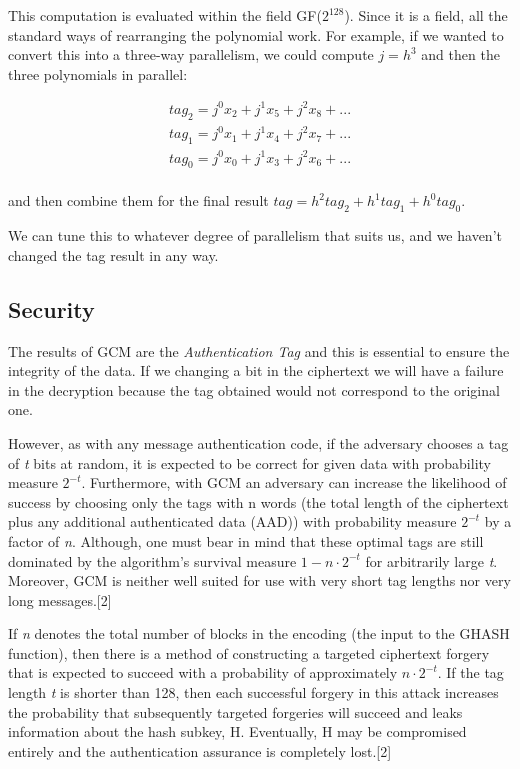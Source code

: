 \documentclass[11pt]{article}
\begin{document}
This computation is evaluated within the field GF($2^{128}$). Since it is a field, all the standard ways of rearranging the polynomial work.
For example, if we wanted to convert this into a three-way parallelism, we could compute $j=h^3$ and then the three polynomials in parallel:

$$
\begin{array}{l}
tag_2 = j^0 x_2 + j^1 x_5 + j^2 x_8 + ... \\
tag_1 = j^0 x_1 + j^1 x_4 + j^2 x_7 + ... \\
tag_0 = j^0 x_0 + j^1 x_3 + j^2 x_6 + ... \\
\end{array}
$$

and then combine them for the final result $ tag = h^2 tag_2 + h^1 tag_1 + h^0 tag_0 $.

We can tune this to whatever degree of parallelism that suits us, and we haven't changed the tag result in any way.

\subsection{Security}
The results of GCM are the {\em Authentication Tag} and this is essential to ensure the integrity of the data. If we changing a bit in the ciphertext we will have a failure in the decryption because the tag obtained would not correspond to the original one.

However, as with any message authentication code, if the adversary chooses a tag of {\em t} bits at random, it is expected to be correct for given data with probability measure $2^{-t}$. Furthermore, with GCM an adversary can increase the likelihood of success by choosing only the tags with n words (the total length of the ciphertext plus any additional authenticated data (AAD)) with probability measure $2^{-t}$ by a factor of {\em n}. Although, one must bear in mind that these optimal tags are still dominated by the algorithm's survival measure $1 - n\cdot2^{-t}$ for arbitrarily large {\em t}. Moreover, GCM is neither well suited for use with very short tag lengths nor very long messages.[2]

If {\em n} denotes the total number of blocks in the encoding (the input to the GHASH function), then there is a method of constructing a targeted ciphertext forgery that is expected to succeed with a probability of approximately $ n\cdot2^{-t}$. If the tag length {\em t} is shorter than 128, then each successful forgery in this attack increases the probability that subsequently targeted forgeries will succeed and leaks information about the hash subkey, H. Eventually, H may be compromised entirely and the authentication assurance is completely lost.[2]
\end{document}
